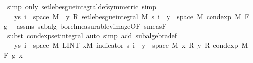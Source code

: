 \begin{isabellebody}
\ {\isacharparenleft}{\kern0pt}simp\ only{\isacharcolon}{\kern0pt}\ set{\isacharunderscore}{\kern0pt}lebesgue{\isacharunderscore}{\kern0pt}integral{\isacharunderscore}{\kern0pt}def{\isacharbrackleft}{\kern0pt}symmetric{\isacharbrackright}{\kern0pt}{\isacharparenright}{\kern0pt}\ simp\isanewline
\ \ \ \ \ \ \ \ \isamarkupfalse%
\ \isamarkupfalse%
\ {\isachardoublequoteopen}{\isachardot}{\kern0pt}{\isachardot}{\kern0pt}{\isachardot}{\kern0pt}\ {\isacharequal}{\kern0pt}\ {\isacharparenleft}{\kern0pt}{\isasymSum}y{\isasymin}s\ i\ {\isacharbackquote}{\kern0pt}\ space\ M{\isachardot}{\kern0pt}\ \ y\ {\isacharasterisk}{\kern0pt}\isactrlsub R\ set{\isacharunderscore}{\kern0pt}lebesgue{\isacharunderscore}{\kern0pt}integral\ M\ {\isacharparenleft}{\kern0pt}s\ i\ {\isacharminus}{\kern0pt}{\isacharbackquote}{\kern0pt}\ {\isacharbraceleft}{\kern0pt}y{\isacharbraceright}{\kern0pt}\ {\isasyminter}\ space\ M{\isacharparenright}{\kern0pt}\ {\isacharparenleft}{\kern0pt}cond{\isacharunderscore}{\kern0pt}exp\ M\ F\ g{\isacharparenright}{\kern0pt}{\isacharparenright}{\kern0pt}{\isachardoublequoteclose}\ \isamarkupfalse%
\ assms{\isacharparenleft}{\kern0pt}{}{\isacharparenright}{\kern0pt}\ subalg\ borel{\isacharunderscore}{\kern0pt}measurable{\isacharunderscore}{\kern0pt}vimage{\isacharbrackleft}{\kern0pt}OF\ s{\isacharunderscore}{\kern0pt}meas{\isacharunderscore}{\kern0pt}F{\isacharbrackright}{\kern0pt}\ \isamarkupfalse%
\ {\isacharparenleft}{\kern0pt}subst\ cond{\isacharunderscore}{\kern0pt}exp{\isacharunderscore}{\kern0pt}set{\isacharunderscore}{\kern0pt}integral{\isacharcomma}{\kern0pt}\ auto\ simp\ add{\isacharcolon}{\kern0pt}\ subalgebra{\isacharunderscore}{\kern0pt}def{\isacharparenright}{\kern0pt}\ \isanewline
\ \ \ \ \ \ \ \ \isamarkupfalse%
\ \isamarkupfalse%
\ {\isachardoublequoteopen}{\isachardot}{\kern0pt}{\isachardot}{\kern0pt}{\isachardot}{\kern0pt}\ {\isacharequal}{\kern0pt}\ {\isacharparenleft}{\kern0pt}{\isasymSum}y{\isasymin}s\ i\ {\isacharbackquote}{\kern0pt}\ space\ M{\isachardot}{\kern0pt}\ LINT\ x{\isacharbar}{\kern0pt}M{\isachardot}{\kern0pt}\ indicator\ {\isacharparenleft}{\kern0pt}s\ i\ {\isacharminus}{\kern0pt}{\isacharbackquote}{\kern0pt}\ {\isacharbraceleft}{\kern0pt}y{\isacharbraceright}{\kern0pt}\ {\isasyminter}\ space\ M{\isacharparenright}{\kern0pt}\ x\ {\isacharasterisk}{\kern0pt}\isactrlsub R\ y\ {\isacharasterisk}{\kern0pt}\isactrlsub R\ cond{\isacharunderscore}{\kern0pt}exp\ M\ F\ g\ x{\isacharparenright}{\kern0pt}{\isachardoublequoteclose}\ \isamarkupfalse%

\end{isabellebody}
